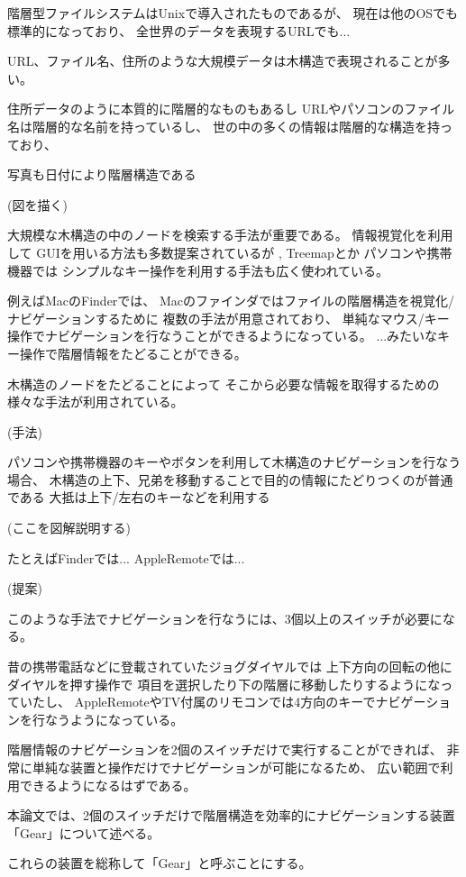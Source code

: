 \documentclass[twoside]{wiss}
\begin{document}
階層型ファイルシステムはUnixで導入されたものであるが、
現在は他のOSでも標準的になっており、
全世界のデータを表現するURLでも...

URL、ファイル名、住所のような大規模データは木構造で表現されることが多い。

住所データのように本質的に階層的なものもあるし
URLやパソコンのファイル名は階層的な名前を持っているし、
世の中の多くの情報は階層的な構造を持っており、

写真も日付により階層構造である

(図を描く)

大規模な木構造の中のノードを検索する手法が重要である。
情報視覚化を利用して
GUIを用いる方法も多数提案されているが
\cite{Johnson:1991:TSA:949607.949654},
  Treemapとか
パソコンや携帯機器では
シンプルなキー操作を利用する手法も広く使われている。

例えばMacのFinderでは、
Macのファインダではファイルの階層構造を視覚化/ナビゲーションするために
複数の手法が用意されており、
単純なマウス/キー操作でナビゲーションを行なうことができるようになっている。
...みたいなキー操作で階層情報をたどることができる。

木構造のノードをたどることによって
そこから必要な情報を取得するための様々な手法が利用されている。

(手法)

パソコンや携帯機器のキーやボタンを利用して木構造のナビゲーションを行なう場合、
木構造の上下、兄弟を移動することで目的の情報にたどりつくのが普通である
大抵は上下/左右のキーなどを利用する

(ここを図解説明する)

たとえばFinderでは... AppleRemoteでは...

(提案)

このような手法でナビゲーションを行なうには、3個以上のスイッチが必要になる。

昔の携帯電話などに登載されていたジョグダイヤルでは
上下方向の回転の他にダイヤルを押す操作で
項目を選択したり下の階層に移動したりするようになっていたし、
AppleRemoteやTV付属のリモコンでは4方向のキーでナビゲーションを行なうようになっている。

階層情報のナビゲーションを2個のスイッチだけで実行することができれば、
非常に単純な装置と操作だけでナビゲーションが可能になるため、
広い範囲で利用できるようになるはずである。

本論文では、2個のスイッチだけで階層構造を効率的にナビゲーションする装置「Gear」について述べる。

これらの装置を総称して「Gear」と呼ぶことにする。
\end{document}
